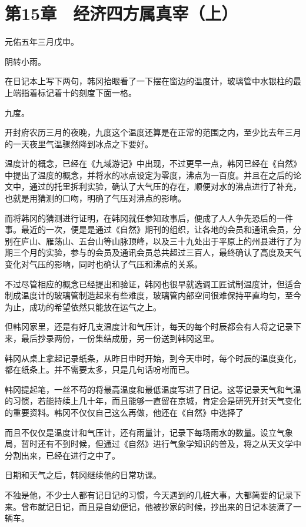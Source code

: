 \section{第15章　经济四方属真宰（上）}

元佑五年三月戊申。

阴转小雨。

在日记本上写下两句，韩冈抬眼看了一下摆在窗边的温度计，玻璃管中水银柱的最上端指着标记着十的刻度下面一格。

九度。

开封府农历三月的夜晚，九度这个温度还算是在正常的范围之内，至少比去年三月的一天夜里气温骤然降到冰点之下要好。

温度计的概念，已经在《九域游记》中出现，不过更早一点，韩冈已经在《自然》中提出了温度的概念，并将水的冰点设定为零度，沸点为一百度。并且在之后的论文中，通过的托里拆利实验，确认了大气压的存在，顺便对水的沸点进行了补充，也就是用猜测的口吻，明确了气压对沸点的影响。

而将韩冈的猜测进行证明，在韩冈就任参知政事后，便成了人人争先恐后的一件事。最近的一次，便是是通过《自然》期刊的组织，让各地的会员和通讯会员，分别在庐山、雁荡山、五台山等山脉顶峰，以及三十九处出于平原上的州县进行了为期三个月的实验，参与的会员及通讯会员总共超过三百人，最终确认了高度及天气变化对气压的影响，同时也确认了气压和沸点的关系。

不过尽管相应的概念已经提出和验证，韩冈也很早就选调工匠试制温度计，但适合制成温度计的玻璃管制造起来有些难度，玻璃管内部空间很难保持平直均匀，至今为止，成功的希望依然只能放在运气之上。

但韩冈家里，还是有好几支温度计和气压计，每天的每个时辰都会有人将之记录下来，最后抄录两份，一份集结成册，另一份送到韩冈这里。

韩冈从桌上拿起记录纸条，从昨日申时开始，到今天申时，每个时辰的温度变化，都在纸条上。并不需要太多，只是几句话吩咐而已。

韩冈提起笔，一丝不苟的将最高温度和最低温度写进了日记。这等记录天气和气温的习惯，若能持续上几十年，而且能够一直留在京城，肯定会是研究开封天气变化的重要资料。韩冈不仅仅自己这么再做，他还在《自然》中选择了

而且不仅仅是温度计和气压计，还有雨量计，记录下每场雨水的数量。设立气象局，暂时还有不到时候，但通过《自然》进行气象学知识的普及，将之从天文学中分割出来，已经在进行之中了。

日期和天气之后，韩冈继续他的日常功课。

不独是他，不少士人都有记日记的习惯，今天遇到的几桩大事，大都简要的记录下来。曾布就记日记，而且是自幼便记，他被抄家的时候，抄出来的日记本装满了一辆车。

